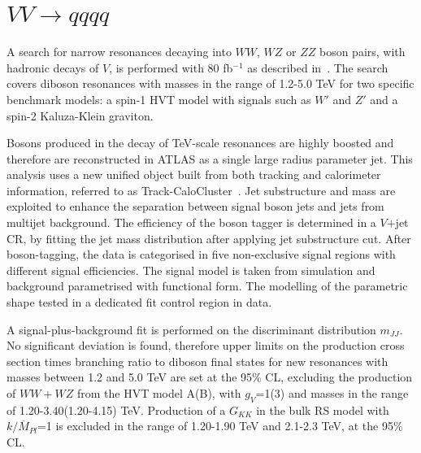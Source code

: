 \documentclass{PoS}
\begin{document}
\vspace*{-4mm}
\section{$VV\rightarrow qqqq$}
\label{sec:VV}
\vspace*{-2mm}
A search for narrow resonances decaying into $WW$, $WZ$ or $ZZ$ boson pairs, with hadronic decays of $V$, is performed with 80 fb$^{-1}$ as described in~\cite{ATLAS-CONF-2018-016}. The search covers diboson resonances with masses in the range of 1.2-5.0 TeV for two specific benchmark models: a spin-1 HVT model with signals such as $W'$ and $Z'$ and a spin-2 Kaluza-Klein graviton.

Bosons produced in the decay of TeV-scale resonances are highly boosted and therefore are reconstructed in ATLAS as a single large radius parameter jet. 
This analysis uses a new unified object built from both tracking and calorimeter information, referred to as Track-CaloCluster~\cite{ATL-PHYS-PUB-2017-015}. 
Jet substructure and mass are exploited to enhance the separation between signal boson jets and jets from multijet background. 
The efficiency of the boson tagger is determined in a $V$+jet CR, by fitting the jet mass distribution after applying jet substructure cut. %
After boson-tagging, the data is categorised in five non-exclusive signal regions with different signal efficiencies.
The signal model is taken from simulation and background parametrised with functional form. 
The modelling of the parametric shape tested in a dedicated fit control region in data.

A signal-plus-background fit is performed on the discriminant distribution $m_{JJ}$.
No significant deviation is found, therefore upper limits on the production cross section times branching ratio to diboson final states for new resonances with masses between 1.2 and 5.0 TeV are set at the 95\% CL, excluding the production of $WW+WZ$ from the HVT model A(B), with $g_V$=1(3) and masses in the range of 1.20-3.40(1.20-4.15) TeV. 
Production of a $G_{KK}$ in the bulk RS model with $k/\overline{M}_{Pl}$=1 is excluded in the range of 1.20-1.90 TeV and 2.1-2.3 TeV, at the 95\% CL.
\end{document}
